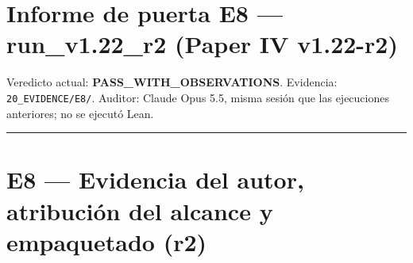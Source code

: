 \documentclass[
]{article}
\author{}
\date{}
\begin{document}
\section{Informe de puerta E8 --- run\_v1.22\_r2 (Paper IV
v1.22-r2)}\label{informe-de-puerta-e8--run_v122_r2-paper-iv-v122-r2}

Veredicto actual: \textbf{PASS\_WITH\_OBSERVATIONS}. Evidencia:
\texttt{20\_EVIDENCE/E8/}. Auditor: Claude Opus 5.5, misma sesión que
las ejecuciones anteriores; no se ejecutó Lean.

\begin{center}\rule{0.5\linewidth}{0.5pt}\end{center}

\section{E8 --- Evidencia del autor, atribución del alcance y
empaquetado
(r2)}\label{e8--evidencia-del-autor-atribuciuxf3n-del-alcance-y-empaquetado-r2}
\end{document}
